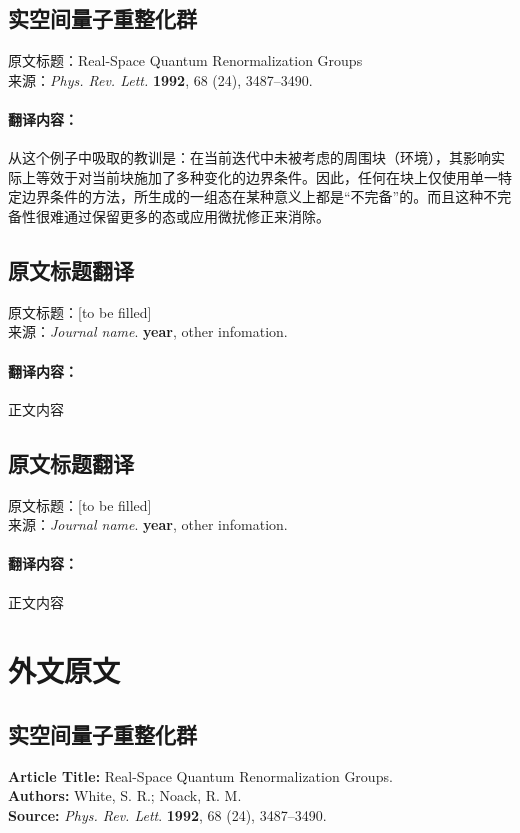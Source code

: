 \documentclass[type=proposal]{wuthesis}
\begin{document}
\section{实空间量子重整化群}
\noindent 原文标题：Real-Space Quantum Renormalization Groups\\
\noindent 来源：\textit{Phys. Rev. Lett.} \textbf{1992}, 68 (24), 3487–3490.
\subsubsection{翻译内容：}
从这个例子中吸取的教训是：在当前迭代中未被考虑的周围块（环境），其影响实际上等效于对当前块施加了多种变化的边界条件。因此，任何在块上仅使用单一特定边界条件的方法，所生成的一组态在某种意义上都是“不完备”的。而且这种不完备性很难通过保留更多的态或应用微扰修正来消除。
\section{原文标题翻译}
\noindent 原文标题：[to be filled]\\
\noindent 来源：\textit{Journal name}. \textbf{year}, other infomation.
\subsubsection{翻译内容：}
正文内容
\section{原文标题翻译}
\noindent 原文标题：[to be filled]\\
\noindent 来源：\textit{Journal name}. \textbf{year}, other infomation.
\subsubsection{翻译内容：}
正文内容


\chapter{外文原文}
\section{实空间量子重整化群}
\noindent \textbf{Article Title:} Real-Space Quantum Renormalization Groups.\\
\noindent \textbf{Authors:} White, S. R.; Noack, R. M.\\
\noindent \textbf{Source:} \textit{Phys. Rev. Lett}. \textbf{1992}, 68 (24), 3487–3490.
\end{document}
